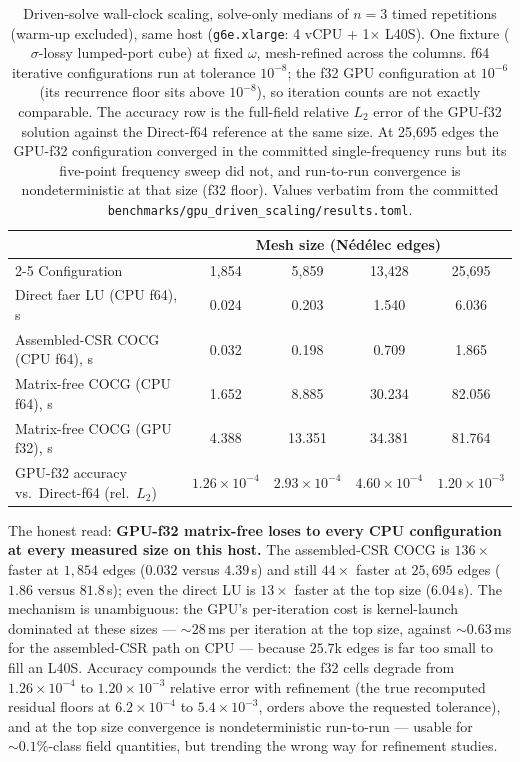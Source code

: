 \documentclass{anvil-paper}
\begin{document}
\begin{table}[t]
  \centering
  \caption{Driven-solve wall-clock scaling, solve-only medians of $n = 3$
  timed repetitions (warm-up excluded), same host (\texttt{g6e.xlarge}:
  4 vCPU + 1$\times$ L40S). One fixture ($\sigma$-lossy lumped-port cube)
  at fixed $\omega$, mesh-refined across the columns. f64 iterative
  configurations run at tolerance $10^{-8}$; the f32 GPU configuration at
  $10^{-6}$ (its recurrence floor sits above $10^{-8}$), so iteration
  counts are not exactly comparable. The accuracy row is the full-field
  relative $L_2$ error of the GPU-f32 solution against the Direct-f64
  reference at the same size. At 25{,}695 edges the GPU-f32 configuration
  converged in the committed single-frequency runs but its five-point
  frequency sweep did not, and run-to-run convergence is nondeterministic
  at that size (f32 floor). Values verbatim from the committed
  \texttt{benchmarks/gpu\_driven\_scaling/results.toml}.}
  \label{tab:gpu}
  \small
  \setlength{\tabcolsep}{5pt}
  \begin{tabular}{@{}lcccc@{}}
    \toprule
    & \multicolumn{4}{c}{Mesh size (N\'ed\'elec edges)} \\
    \cmidrule(l){2-5}
    Configuration & 1{,}854 & 5{,}859 & 13{,}428 & 25{,}695 \\
    \midrule
    Direct faer LU (CPU f64), s & 0.024 & 0.203 & 1.540 & 6.036 \\
    Assembled-CSR COCG (CPU f64), s & 0.032 & 0.198 & 0.709 & 1.865 \\
    Matrix-free COCG (CPU f64), s & 1.652 & 8.885 & 30.234 & 82.056 \\
    Matrix-free COCG (GPU f32), s & 4.388 & 13.351 & 34.381 & 81.764 \\
    \midrule
    GPU-f32 accuracy vs.\ Direct-f64 (rel.\ $L_2$) &
      $1.26\times10^{-4}$ & $2.93\times10^{-4}$ &
      $4.60\times10^{-4}$ & $1.20\times10^{-3}$ \\
    \bottomrule
  \end{tabular}
\end{table}

The honest read: \textbf{GPU-f32 matrix-free loses to every CPU
configuration at every measured size on this host.} The assembled-CSR COCG
is $136\times$ faster at $1{,}854$ edges ($0.032$ versus $4.39$\,s) and
still $44\times$ faster at $25{,}695$ edges ($1.86$ versus $81.8$\,s);
even the direct LU is $13\times$ faster at the top size ($6.04$\,s). The
mechanism is unambiguous: the GPU's per-iteration cost is kernel-launch
dominated at these sizes --- ${\sim}28$\,ms per iteration at the top size,
against ${\sim}0.63$\,ms for the assembled-CSR path on CPU --- because
$25.7$k edges is far too small to fill an L40S. Accuracy compounds the
verdict: the f32 cells degrade from $1.26\times10^{-4}$ to
$1.20\times10^{-3}$ relative error with refinement (the true recomputed
residual floors at $6.2\times10^{-4}$ to $5.4\times10^{-3}$, orders above
the requested tolerance), and at the top size convergence is
nondeterministic run-to-run --- usable for ${\sim}0.1\%$-class field
quantities, but trending the wrong way for refinement studies.
\end{document}
